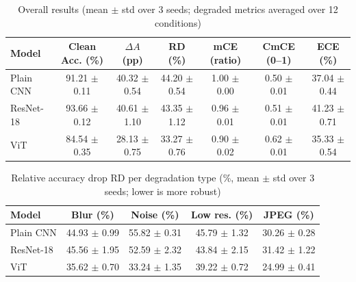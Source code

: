\begin{table}[!t]
\centering
\caption{Overall results (mean $\pm$ std over 3 seeds; degraded metrics averaged over 12 conditions)}
\label{tab:overall}
\begin{tabular}{lcccccc}
\toprule
Model & Clean Acc. (\%) & $\Delta A$ (pp) & RD (\%) & mCE (ratio) & CmCE (0--1) & ECE (\%) \\
\midrule
Plain CNN & 91.21 $\pm$ 0.11 & 40.32 $\pm$ 0.54 & 44.20 $\pm$ 0.54 & 1.00 $\pm$ 0.00 & 0.50 $\pm$ 0.01 & 37.04 $\pm$ 0.44 \\
ResNet-18 & 93.66 $\pm$ 0.12 & 40.61 $\pm$ 1.10 & 43.35 $\pm$ 1.12 & 0.96 $\pm$ 0.01 & 0.51 $\pm$ 0.01 & 41.23 $\pm$ 0.71 \\
ViT & 84.54 $\pm$ 0.35 & 28.13 $\pm$ 0.75 & 33.27 $\pm$ 0.76 & 0.90 $\pm$ 0.02 & 0.62 $\pm$ 0.01 & 35.33 $\pm$ 0.54 \\
\bottomrule
\end{tabular}
\end{table}

\begin{table}[!t]
\centering
\caption{Relative accuracy drop RD per degradation type (\%, mean $\pm$ std over 3 seeds; lower is more robust)}
\label{tab:rd_type}
\begin{tabular}{lcccc}
\toprule
Model & Blur (\%) & Noise (\%) & Low res. (\%) & JPEG (\%) \\
\midrule
Plain CNN & 44.93 $\pm$ 0.99 & 55.82 $\pm$ 0.31 & 45.79 $\pm$ 1.32 & 30.26 $\pm$ 0.28 \\
ResNet-18 & 45.56 $\pm$ 1.95 & 52.59 $\pm$ 2.32 & 43.84 $\pm$ 2.15 & 31.42 $\pm$ 1.22 \\
ViT & 35.62 $\pm$ 0.70 & 33.24 $\pm$ 1.35 & 39.22 $\pm$ 0.72 & 24.99 $\pm$ 0.41 \\
\bottomrule
\end{tabular}
\end{table}